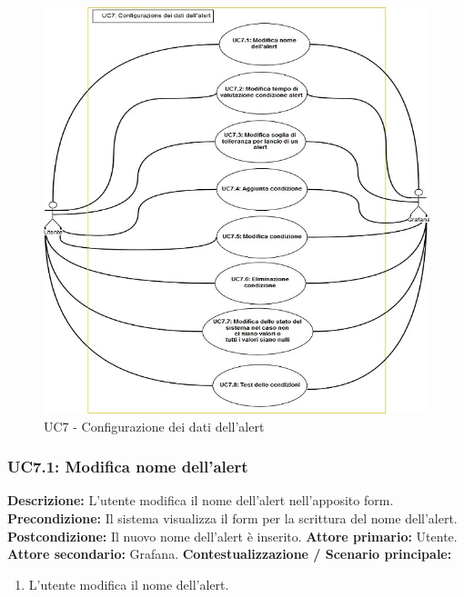         \begin{figure}[!htbp]
                    	\centering
                    	\includegraphics[width=\textwidth]{UC7.png}
                    	\caption{UC7 - Configurazione dei dati dell'alert}
                    	\label{uc7}
                    \end{figure} 
                
                \subsubsection{UC7.1: Modifica nome dell'alert}
                    \textbf{Descrizione:} L’utente modifica il nome dell'alert nell'apposito form.
                    \newline
                    \textbf{Precondizione:} Il sistema visualizza il form per la scrittura del nome dell'alert.
                    \newline
                    \textbf{Postcondizione:} Il nuovo nome dell'alert è inserito.
                    \newline
                    \textbf{Attore primario:} Utente.
                    \newline
                    \textbf{Attore secondario:} Grafana.
                    \newline
                    \textbf{Contestualizzazione / Scenario principale:} \begin{enumerate}
                            \item L’utente modifica il nome dell'alert.
                        \end{enumerate}
                        
